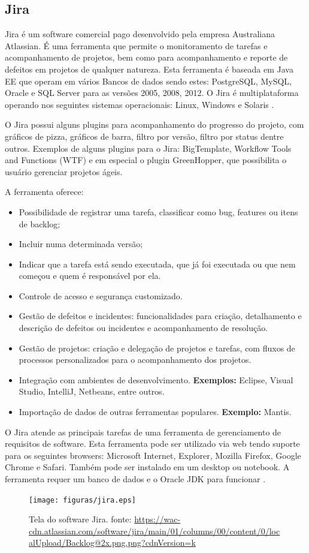 \subsection{Jira}

Jira é um software comercial pago desenvolvido pela empresa Australiana Atlassian. É uma ferramenta que permite o monitoramento de tarefas e acompanhamento de projetos, bem como para acompanhamento e reporte de defeitos em projetos de qualquer natureza. Esta ferramenta é baseada em Java EE que operam em vários Bancos de dados sendo estes: PostgreSQL, MySQL, Oracle e SQL Server para as versões 2005, 2008, 2012. O Jira é multiplataforma operando nos seguintes sistemas operacionais: Linux, Windows e Solaris \cite{jira2016}. 

O Jira possui alguns plugins para acompanhamento do progresso do projeto, com gráficos de pizza, gráficos de barra, filtro por versão, filtro por status dentre outros. Exemplos de alguns plugins para o Jira: BigTemplate, Workflow Tools and Functions (WTF) e em especial o plugin GreenHopper, que possibilita o usuário gerenciar projetos ágeis. 

A ferramenta oferece:
\begin{itemize}
    \item Possibilidade de registrar uma tarefa, classificar como bug, features ou itens de backlog;
    \item Incluir numa determinada versão;
    \item Indicar que a tarefa está sendo executada, que já foi executada ou que nem começou e quem é responsável por ela. 
    \item Controle de acesso e segurança customizado.
    \item Gestão de defeitos e incidentes: funcionalidades para criação, detalhamento e descrição de defeitos  ou incidentes e acompanhamento de resolução.
    \item Gestão de projetos: criação e delegação de projetos e tarefas, com fluxos de processos personalizados para o acompanhamento dos projetos.
    \item Integração com ambientes de desenvolvimento. \textbf{Exemplos:} Eclipse, Visual Studio, IntelliJ, Netbeans, entre outros.
    \item Importação de dados de outras ferramentas populares. \textbf{Exemplo:} Mantis.
\end{itemize} 

O Jira atende as principais tarefas de uma ferramenta de gerenciamento de requisitos de software. Esta ferramenta pode ser utilizado via web tendo suporte para os seguintes browsers: Microsoft Internet, Explorer, Mozilla Firefox, Google Chrome e Safari. Também pode ser instalado em um desktop ou notebook. A ferramenta requer um banco de dados e o Oracle JDK para funcionar \cite{jira2016}.
\begin{figure}[H]
    \centering
    \caption[Tela do software Jira]{Tela do software Jira. fonte: \url{https://wac-cdn.atlassian.com/software/jira/main/01/columns/00/content/0/localUpload/Backlog@2x.png.png?cdnVersion=k}}
    \label{jiraFerramenta}
    \texttt{[image: figuras/jira.eps]}
\end{figure}

